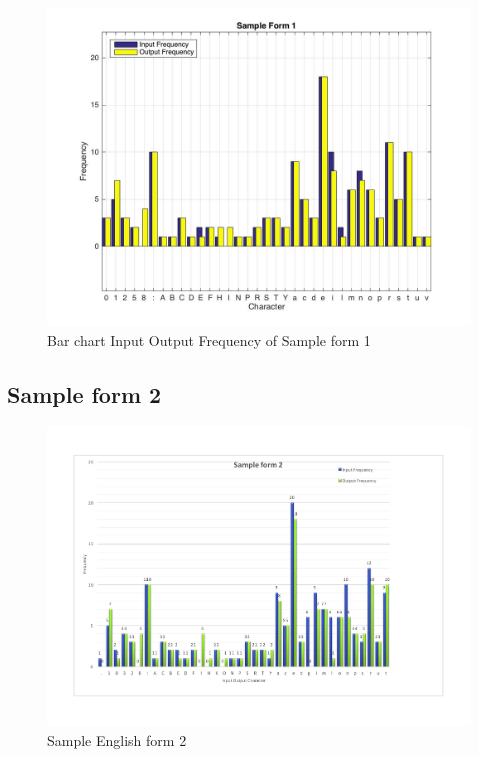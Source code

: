 \begin{figure}[H]
\centering
\includegraphics[width=.9\textwidth]{Form1}
\caption {Bar chart Input Output Frequency of Sample form 1}
\label {fig:bar1}
\end{figure}

\subsection{Sample form 2}

\begin{figure}[H]
\centering
\includegraphics[width=1\textwidth]{form2}
\caption {Sample English form 2}
\label {fig:form2}
\end{figure}

